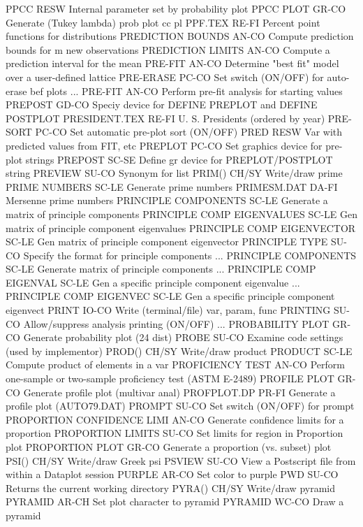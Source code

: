 PPCC                        RESW  Internal parameter set by probability plot
PPCC PLOT                   GR-CO Generate (Tukey lambda) prob plot cc pl
PPF.TEX                     RE-FI Percent point functions for distributions
PREDICTION BOUNDS           AN-CO Compute prediction bounds for m new observations
PREDICTION LIMITS           AN-CO Compute a prediction interval for the mean
PRE-FIT                     AN-CO Determine "best fit" model over a user-defined lattice
PRE-ERASE                   PC-CO Set switch (ON/OFF) for auto-erase bef plots
... PRE-FIT                 AN-CO Perform pre-fit analysis for starting values
PREPOST                     GD-CO Speciy device for DEFINE PREPLOT and DEFINE POSTPLOT
PRESIDENT.TEX               RE-FI U. S. Presidents (ordered by year)
PRE-SORT                    PC-CO Set automatic pre-plot sort (ON/OFF)
PRED                        RESW  Var with predicted values from FIT, etc
PREPLOT                     PC-CO Set graphics device for pre-plot strings
PREPOST                     SC-SE Define gr device for PREPLOT/POSTPLOT string
PREVIEW                     SU-CO Synonym for list
PRIM()                      CH/SY Write/draw prime
PRIME NUMBERS               SC-LE Generate prime numbers
PRIMESM.DAT                 DA-FI Mersenne prime numbers
PRINCIPLE COMPONENTS        SC-LE Generate a matrix of principle components
PRINCIPLE COMP EIGENVALUES  SC-LE Gen matrix of principle component eigenvalues
PRINCIPLE COMP EIGENVECTOR  SC-LE Gen matrix of principle component eigenvector
PRINCIPLE TYPE              SU-CO Specify the format for principle components
... PRINCIPLE COMPONENTS    SC-LE Generate matrix of principle components
... PRINCIPLE COMP EIGENVAL SC-LE Gen a specific principle component eigenvalue
... PRINCIPLE COMP EIGENVEC SC-LE Gen a specific principle component eigenvect
PRINT                       IO-CO Write (terminal/file) var, param, func
PRINTING                    SU-CO Allow/suppress analysis printing (ON/OFF)
... PROBABILITY PLOT        GR-CO Generate probability plot (24 dist)
PROBE                       SU-CO Examine code settings (used by implementor)
PROD()                      CH/SY Write/draw product
PRODUCT                     SC-LE Compute product of elements in a var
PROFICIENCY TEST            AN-CO Perform one-sample or two-sample proficiency test (ASTM E-2489)
PROFILE PLOT                GR-CO Generate profile plot (multivar anal)
PROFPLOT.DP                 PR-FI Generate a profile plot (AUTO79.DAT)
PROMPT                      SU-CO Set switch (ON/OFF) for prompt
PROPORTION CONFIDENCE LIMI  AN-CO Generate confidence limits for a proportion
PROPORTION LIMITS           SU-CO Set limits for region in Proportion plot
PROPORTION PLOT             GR-CO Generate a proportion (vs. subset) plot
PSI()                       CH/SY Write/draw Greek psi
PSVIEW                      SU-CO View a Postscript file from within a Dataplot session
PURPLE                      AR-CO Set color to purple
PWD                         SU-CO Returns the current working directory
PYRA()                      CH/SY Write/draw pyramid
PYRAMID                     AR-CH Set plot character to pyramid
PYRAMID                     WC-CO Draw a pyramid

